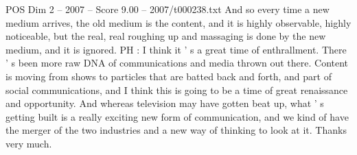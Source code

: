 \begin{textsample}{POS Dim 2 – 2007 – Score 9.00 – 2007/t000238.txt}
And so every time a new medium arrives, the old medium is the content, and it is highly observable, highly noticeable, but the real, real roughing up and massaging is done by the new medium, and it is ignored.
PH : I think it ' s a great time of enthrallment.
There ' s been more raw DNA of communications and media thrown out there.
Content is moving from shows to particles that are batted back and forth, and part of social communications, and I think this is going to be a time of great renaissance and opportunity.
And whereas television may have gotten beat up, what ' s getting built is a really exciting new form of communication, and we kind of have the merger of the two industries and a new way of thinking to look at it.
Thanks very much.

\end{textsample}
